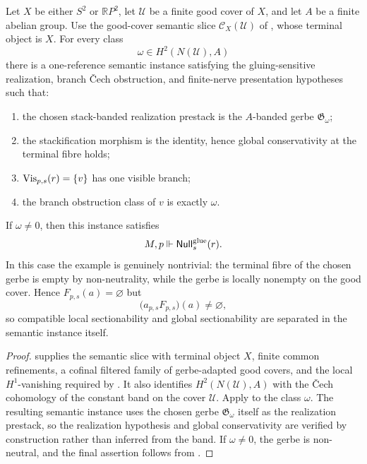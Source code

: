 \begin{corollary}\label{cor:good-cover-semantic-models}
Let $X$ be either $S^2$ or $\mathbb{R}P^2$, let $\mathcal U$ be a finite good cover of $X$, and let $A$ be a finite abelian group. Use the good-cover semantic slice $\mathcal C_X(\mathcal U)$ of , whose terminal object is $X$. For every class
\[
\omega\in H^2(N(\mathcal U),A)
\]
there is a one-reference semantic instance satisfying the gluing-sensitive
realization, branch \v{C}ech obstruction, and finite-nerve presentation
hypotheses such that:
\begin{enumerate}[label=(\roman*),nosep]
\item the chosen stack-banded realization prestack is the $A$-banded gerbe $\mathfrak G_\omega$;
\item the stackification morphism is the identity, hence global conservativity at the terminal fibre holds;
\item $\mathrm{Vis}_{p,s}(r)=\{v\}$ has one visible branch;
\item the branch obstruction class of $v$ is exactly $\omega$.
\end{enumerate}
If $\omega\neq 0$, then this instance satisfies
\[
M,p\Vdash \mathsf{Null}^{\mathrm{glue}}_s(r).
\]
In this case the example is genuinely nontrivial: the terminal fibre of the
chosen gerbe is empty by non-neutrality, while the gerbe is locally nonempty on
the good cover. Hence $F_{p,s}(a)=\varnothing$ but
\[
\bigl(a_{p,s}F_{p,s}\bigr)(a)\neq\varnothing,
\]
so compatible local sectionability and global sectionability are separated in
the semantic instance itself.
\end{corollary}

\begin{proof}
 supplies the semantic slice with
terminal object $X$, finite common refinements, a cofinal filtered family of
gerbe-adapted good covers, and the local $H^1$-vanishing required by
. It also identifies
$H^2(N(\mathcal U),A)$ with the \v{C}ech cohomology of the constant band on the
cover $\mathcal U$. Apply  to the class
$\omega$. The resulting semantic instance uses the chosen gerbe
$\mathfrak G_\omega$ itself as the realization prestack, so the realization
hypothesis and global conservativity are verified by construction rather than
inferred from the band. If $\omega\neq 0$, the gerbe is non-neutral, and the
final assertion follows from .
\end{proof}

